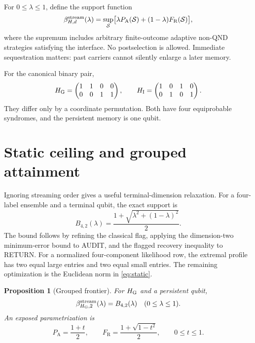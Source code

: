 \documentclass[10pt,twocolumn]{article}
\newtheorem{proposition}[theorem]{Proposition}
\theoremstyle{remark}
\newcommand{\PA}{P_{\mathrm A}}
\newcommand{\FR}{F_{\mathrm R}}
\newcommand{\BG}{B_{4,2}}
\begin{document}
For $0\leq\lambda\leq1$, define the support function
\begin{equation}
\beta^{\rm stream}_{H,d}(\lambda)
=\sup_{\mathcal S}\bigl[\lambda\PA(\mathcal S)
+(1-\lambda)\FR(\mathcal S)\bigr],
\label{eq:support}
\end{equation}
where the supremum includes arbitrary finite-outcome adaptive non-QND
strategies satisfying the interface. No postselection is allowed. Immediate
sequestration matters: past carriers cannot silently enlarge a later memory.

For the canonical binary pair,
\begin{equation}
H_{\rm G}=\begin{pmatrix}1&1&0&0\\0&0&1&1\end{pmatrix},\qquad
H_{\rm I}=\begin{pmatrix}1&0&1&0\\0&1&0&1\end{pmatrix}.
\label{eq:matrices}
\end{equation}
They differ only by a coordinate permutation. Both have four equiprobable
syndromes, and the persistent memory is one qubit.

\section{Static ceiling and grouped attainment}
\label{sec:grouped}

Ignoring streaming order gives a useful terminal-dimension relaxation. For a
four-label ensemble and a terminal qubit, the exact support is
\begin{equation}
\BG(\lambda)=
\frac{1+\sqrt{\lambda^2+(1-\lambda)^2}}{2}.
\label{eq:static}
\end{equation}
The bound follows by refining the classical flag, applying the dimension-two
minimum-error bound to AUDIT, and the flagged recovery inequality to RETURN.
For a normalized four-component likelihood row, the extremal profile has two
equal large entries and two equal small entries. The remaining optimization is
the Euclidean norm in \eqref{eq:static}.

\begin{proposition}[Grouped frontier]
For $H_{\rm G}$ and a persistent qubit,
\begin{equation}
\beta^{\rm stream}_{H_{\rm G},2}(\lambda)=\BG(\lambda)
\quad(0\leq\lambda\leq1).
\end{equation}
An exposed parametrization is
\begin{equation}
\PA=\frac{1+t}{2},\qquad
\FR=\frac{1+\sqrt{1-t^2}}2,\qquad0\leq t\leq1.
\label{eq:groupedcurve}
\end{equation}
\end{proposition}
\end{document}
